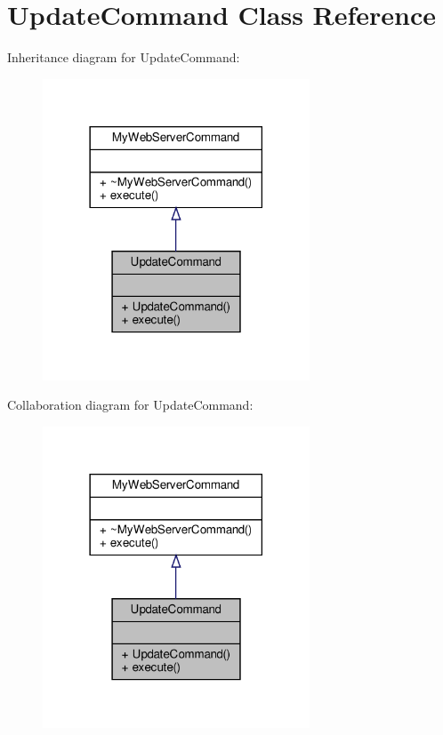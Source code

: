 \hypertarget{classUpdateCommand}{}\section{Update\+Command Class Reference}
\label{classUpdateCommand}


Inheritance diagram for Update\+Command\+:\nopagebreak
\begin{figure}[H]
\begin{center}
\leavevmode
\includegraphics[width=225pt]{classUpdateCommand__inherit__graph}
\end{center}
\end{figure}


Collaboration diagram for Update\+Command\+:\nopagebreak
\begin{figure}[H]
\begin{center}
\leavevmode
\includegraphics[width=225pt]{classUpdateCommand__coll__graph}
\end{center}
\end{figure}

